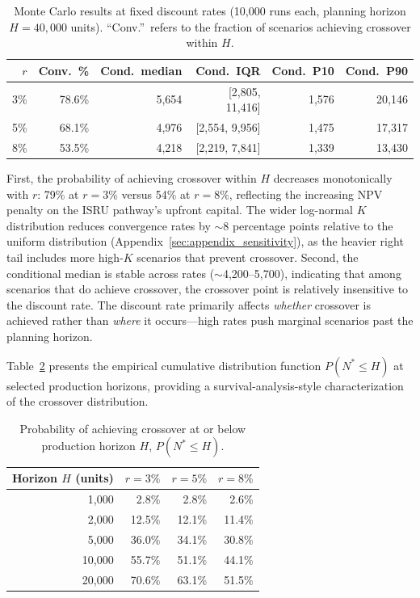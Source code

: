 \documentclass[preprint,12pt]{elsarticle}
\begin{document}
\begin{table}[htbp]
\centering
\caption{Monte Carlo results at fixed discount rates (10{,}000 runs each, planning horizon $H = 40{,}000$ units). ``Conv.''\ refers to the fraction of scenarios achieving crossover within $H$.}
\label{tab:mc_summary}
\small
\begin{tabular}{@{}rrrrrr@{}}
\toprule
$r$ & Conv.\ \% & Cond.\ median & Cond.\ IQR & Cond.\ P10 & Cond.\ P90 \\
\midrule
3\%  & 78.6\% & 5{,}654 & [2{,}805, 11{,}416] & 1{,}576 & 20{,}146 \\
5\%  & 68.1\% & 4{,}976 & [2{,}554, 9{,}956]  & 1{,}475 & 17{,}317 \\
8\%  & 53.5\% & 4{,}218 & [2{,}219, 7{,}841]  & 1{,}339 & 13{,}430 \\
\bottomrule
\end{tabular}
\end{table}

First, the probability of achieving crossover within $H$ decreases monotonically with $r$: 79\% at $r = 3\%$ versus 54\% at $r = 8\%$, reflecting the increasing NPV penalty on the ISRU pathway's upfront capital. The wider log-normal $K$ distribution reduces convergence rates by $\sim$8 percentage points relative to the uniform distribution (Appendix~\ref{sec:appendix_sensitivity}), as the heavier right tail includes more high-$K$ scenarios that prevent crossover. Second, the conditional median is stable across rates ($\sim$4{,}200--5{,}700), indicating that among scenarios that do achieve crossover, the crossover point is relatively insensitive to the discount rate. The discount rate primarily affects \emph{whether} crossover is achieved rather than \emph{where} it occurs---high rates push marginal scenarios past the planning horizon.

Table~\ref{tab:convergence} presents the empirical cumulative distribution function $P(N^* \leq H)$ at selected production horizons, providing a survival-analysis-style characterization of the crossover distribution.

\begin{table}[htbp]
\centering
\caption{Probability of achieving crossover at or below production horizon $H$, $P(N^* \leq H)$.}
\label{tab:convergence}
\small
\begin{tabular}{@{}rrrr@{}}
\toprule
Horizon $H$ (units) & $r = 3\%$ & $r = 5\%$ & $r = 8\%$ \\
\midrule
1{,}000  & 2.8\% & 2.8\% & 2.6\% \\
2{,}000  & 12.5\% & 12.1\% & 11.4\% \\
5{,}000  & 36.0\% & 34.1\% & 30.8\% \\
10{,}000 & 55.7\% & 51.1\% & 44.1\% \\
20{,}000 & 70.6\% & 63.1\% & 51.5\% \\
\bottomrule
\end{tabular}
\end{table}
\end{document}
